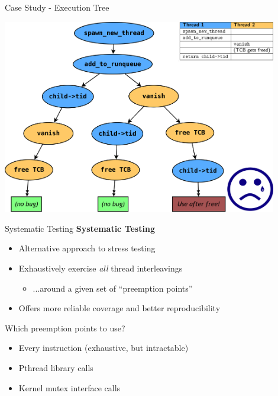 \documentclass[xcolor=dvipsnames]{beamer}
\begin{document}
\begin{frame}{Case Study - Execution Tree}
	\begin{center}
		\includegraphics[width=0.9\textwidth]{threadfork2.png}
	\end{center}
\end{frame}


\begin{frame}{Systematic Testing}
	\textbf{Systematic Testing}
	\begin{itemize}
		\item Alternative approach to stress testing
		\item Exhaustively exercise {\em all} thread interleavings
		\begin{itemize}
			\item ...around a given set of ``preemption points''
		\end{itemize}
		\item Offers more reliable coverage and better reproducibility
	\end{itemize}
	\pause
	\linegap

	Which preemption points to use?
	\begin{itemize}
		\item Every instruction (exhaustive, but intractable)
		\item Pthread library calls
		\item Kernel mutex interface calls
	\end{itemize}

\end{frame}
\end{document}
